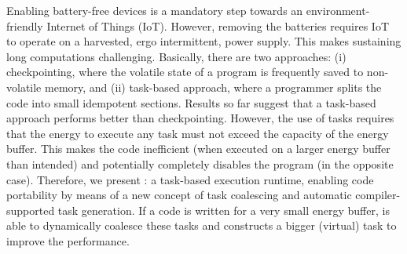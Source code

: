Enabling battery-free devices is a mandatory step towards an environment-friendly Internet of Things (IoT). However, removing the batteries requires IoT to operate on a harvested, ergo intermittent, power supply. This makes sustaining long computations challenging. Basically, there are two approaches: (i) checkpointing, where the volatile state of a program is frequently saved to non-volatile memory, and (ii) task-based approach, where a programmer splits the code into small idempotent sections. Results so far suggest that a task-based approach performs better than checkpointing. However, the use of tasks requires that the energy to execute any task must not exceed the capacity of the energy buffer. This makes the code inefficient (when executed on a larger energy buffer than intended) and potentially completely disables the program (in the opposite case). Therefore, we present \sys: a task-based execution runtime, enabling code portability by means of a new concept of task coalescing and automatic compiler-supported task generation. If a code is written for a very small energy buffer, \sys is able to dynamically coalesce these tasks and constructs a bigger (virtual) task to improve the performance. 